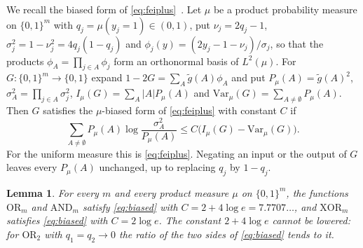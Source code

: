 \documentclass[11pt]{amsart}
\newtheorem{lemma}[theorem]{Lemma}
\theoremstyle{definition}
\theoremstyle{remark}
\newcommand{\Var}{\mathrm{Var}}
\newcommand{\bits}{\{0,1\}}
\begin{document}
We recall the biased form of \eqref{eq:feiplus}~\cite{OT13}. Let $\mu$ be a product probability measure on
$\bits^m$ with $q_j=\mu(y_j=1)\in(0,1)$, put $\nu_j=2q_j-1$, $\sigma_j^2=1-\nu_j^2=4q_j(1-q_j)$ and
$\phi_j(y)=(2y_j-1-\nu_j)/\sigma_j$, so that the products $\phi_A=\prod_{j\in A}\phi_j$ form an orthonormal basis of
$L^2(\mu)$. For $G:\bits^m\to\bits$ expand $1-2G=\sum_A\widetilde g(A)\phi_A$ and put $P_\mu(A)=\widetilde g(A)^2$,
$\sigma_A^2=\prod_{j\in A}\sigma_j^2$, $I_\mu(G)=\sum_A|A|P_\mu(A)$ and $\Var_\mu(G)=\sum_{A\ne\emptyset}P_\mu(A)$.
Then $G$ satisfies the $\mu$-biased form of \eqref{eq:feiplus} with constant $C$ if
\begin{equation}\label{eq:biased}
\sum_{A\ne\emptyset}P_\mu(A)\log\frac{\sigma_A^2}{P_\mu(A)}\le C\bigl(I_\mu(G)-\Var_\mu(G)\bigr).
\end{equation}
For the uniform measure this is \eqref{eq:feiplus}. Negating an input or the output of $G$ leaves every
$P_\mu(A)$ unchanged, up to replacing $q_j$ by $1-q_j$.

\begin{lemma}\label{lem:andor}
For every $m$ and every product measure $\mu$ on $\bits^m$, the functions $\mathrm{OR}_m$ and $\mathrm{AND}_m$
satisfy \eqref{eq:biased} with $C=2+4\log e=7.7707\ldots$, and $\mathrm{XOR}_m$ satisfies \eqref{eq:biased} with
$C=2\log e$. The constant $2+4\log e$ cannot be lowered: for $\mathrm{OR}_2$ with $q_1=q_2\to0$ the ratio of the two
sides of \eqref{eq:biased} tends to it.
\end{lemma}
\end{document}
